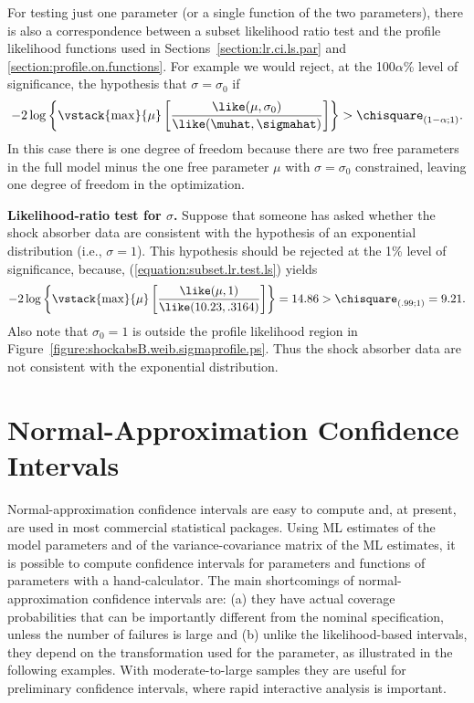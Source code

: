 For testing just one parameter (or a single function of
the two parameters), there is also a correspondence between a subset
likelihood ratio test and the profile likelihood functions used in
Sections~\ref{section:lr.ci.ls.par} and
\ref{section:profile.on.functions}.
For example we would reject, at the 100$\alpha$\% level of significance,
the hypothesis that $\sigma=\sigma_{0}$ if
\begin{equation}
\label{equation:subset.lr.test.ls}
-2\log
\left \{ \vstack{\max}{\mu}
\left[\frac{\like(\mu,\sigma_{0})}{\like(\muhat,\sigmahat)}\right ]\right \} > 
	\chisquare_{(1-\alpha;1)}.
\end{equation}
In this case there is one degree of freedom because there are
two free parameters in the full model minus the one free parameter $\mu$
with $\sigma=\sigma_{0}$ constrained,
leaving one degree of freedom in the optimization.


\begin{example}
{\bf Likelihood-ratio test for $\sigma$.} Suppose that someone has
asked whether the shock absorber data are consistent with the
hypothesis of an exponential distribution (i.e., $\sigma=1$).  This
hypothesis should be rejected at the 1\% level of significance,
because, (\ref{equation:subset.lr.test.ls}) yields
\begin{displaymath}
-2\log
\left \{ \vstack{\max}{\mu}  \left [\frac{ \like(\mu,1)}
{\like(10.23,.3164)} \right ]\right \} = 14.86 > \chisquare_{(.99;1)} = 9.21.
\end{displaymath} 
Also note that $\sigma_{0}=1$ is outside the profile likelihood
region in Figure~\ref{figure:shockabsB.weib.sigmaprofile.ps}.  Thus the
shock absorber data are not consistent with the exponential
distribution.
\end{example}
\section{Normal-Approximation Confidence Intervals}
\label{section:location.scale.normal.theory.ci}
Normal-approximation confidence intervals are easy to compute and, at
present, are used in most commercial statistical packages. Using ML
estimates of the model parameters and of the variance-covariance
matrix of the ML estimates, it is possible to compute confidence intervals 
for parameters
and functions of parameters with a hand-calculator. The main
shortcomings of normal-approximation confidence intervals are: (a) they
have actual coverage probabilities that can be importantly different
from the nominal specification, unless the number of failures is large and (b)
unlike the likelihood-based intervals, they depend on the
transformation used for the parameter, as illustrated in the following
examples. With moderate-to-large samples they are useful for preliminary 
confidence intervals, where rapid interactive analysis is important.

